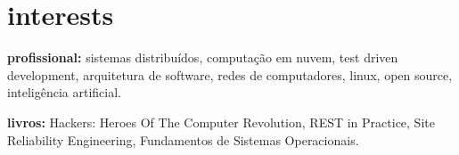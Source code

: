 \documentclass[]{friggeri-cv} %
\begin{document}
\pagebreak


\section{interests}

\textbf{profissional:} sistemas distribuídos, computação em nuvem, test driven development, arquitetura de software, redes de computadores, linux, open source, inteligência artificial.

\textbf{livros:} Hackers: Heroes Of The Computer Revolution, REST in Practice, Site Reliability Engineering, Fundamentos de Sistemas Operacionais.
\end{document}
